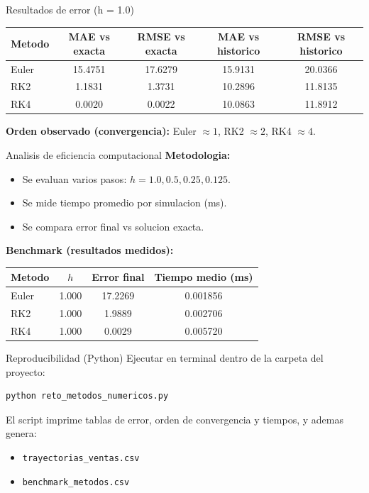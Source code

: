 \documentclass[aspectratio=169]{beamer}
\begin{document}
\begin{frame}{Resultados de error (h = 1.0)}
\begin{table}
\centering
\small
\begin{tabular}{lcccc}
\toprule
Metodo & MAE vs exacta & RMSE vs exacta & MAE vs historico & RMSE vs historico \\
\midrule
Euler & 15.4751 & 17.6279 & 15.9131 & 20.0366 \\
RK2   & 1.1831  & 1.3731  & 10.2896 & 11.8135 \\
RK4   & 0.0020  & 0.0022  & 10.0863 & 11.8912 \\
\bottomrule
\end{tabular}
\end{table}

\vspace{0.1cm}
\textbf{Orden observado (convergencia):}
Euler $\approx 1$, RK2 $\approx 2$, RK4 $\approx 4$.
\end{frame}

\begin{frame}{Analisis de eficiencia computacional}
\textbf{Metodologia:}
\begin{itemize}
  \item Se evaluan varios pasos: $h = 1.0, 0.5, 0.25, 0.125$.
  \item Se mide tiempo promedio por simulacion (ms).
  \item Se compara error final vs solucion exacta.
\end{itemize}

\vspace{0.2cm}
\textbf{Benchmark (resultados medidos):}
\begin{table}
\centering
\begin{tabular}{lccc}
\toprule
Metodo & $h$ & Error final & Tiempo medio (ms) \\
\midrule
Euler & 1.000 & 17.2269 & 0.001856 \\
RK2   & 1.000 & 1.9889  & 0.002706 \\
RK4   & 1.000 & 0.0029  & 0.005720 \\
\bottomrule
\end{tabular}
\end{table}
\end{frame}

\begin{frame}[fragile]{Reproducibilidad (Python)}
Ejecutar en terminal dentro de la carpeta del proyecto:

\begin{lstlisting}
python reto_metodos_numericos.py
\end{lstlisting}

El script imprime tablas de error, orden de convergencia y tiempos, y ademas genera:
\begin{itemize}
  \item \texttt{trayectorias\_ventas.csv}
  \item \texttt{benchmark\_metodos.csv}
\end{itemize}
\end{frame}
\end{document}
